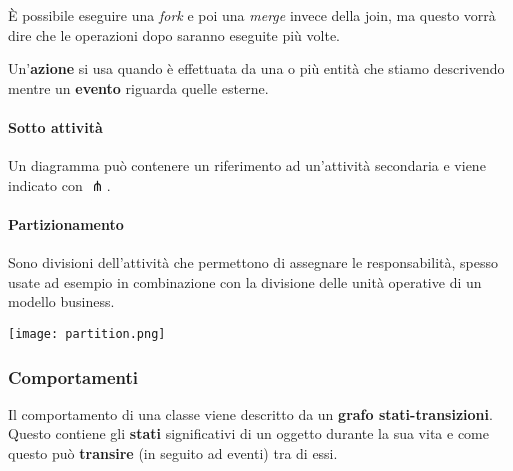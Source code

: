 \begin{note}
	È possibile eseguire una \textit{fork} e poi una \textit{merge} invece della join, ma questo vorrà dire che le operazioni dopo saranno eseguite più volte.
\end{note}

\begin{note}
	Un'\textbf{azione} si usa quando è effettuata da una o più entità che stiamo descrivendo mentre un \textbf{evento} riguarda quelle esterne.
\end{note}

\paragraph{Sotto attività}
Un diagramma può contenere un riferimento ad un'attività secondaria e viene indicato con $\pitchfork$.

\paragraph{Partizionamento} Sono divisioni dell'attività che permettono di assegnare le responsabilità, spesso usate ad esempio in combinazione con la divisione delle unità operative di un modello business.
\begin{center}
	\texttt{[image: partition.png]}
\end{center}

\subsubsection{Comportamenti}
Il comportamento di una classe viene descritto da un \textbf{grafo stati-transizioni}. Questo contiene gli \textbf{stati} significativi di un oggetto durante la sua vita e come questo può \textbf{transire} (in seguito ad eventi) tra di essi.